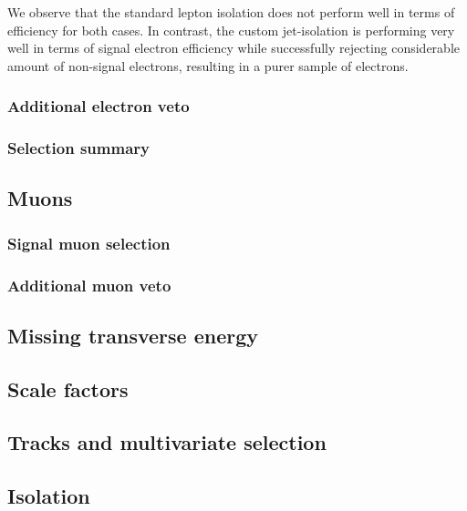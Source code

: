 We observe that the standard lepton isolation does not perform well in terms of efficiency for both \dm cases. In contrast, the custom jet-isolation is performing very well in terms of signal electron efficiency while successfully rejecting considerable amount of non-signal electrons, resulting in a purer sample of electrons.

\subsubsection{Additional electron veto}
\subsubsection{Selection summary}
\subsection{Muons}
\subsubsection{Signal muon selection}
\label{sec:muon-selection}
\subsubsection{Additional muon veto}

\subsection{Missing transverse energy}
\label{subsec:met}

\subsection{Scale factors}


\subsection{Tracks and multivariate selection }
\subsection{Isolation}
\label{sec:isolation}

